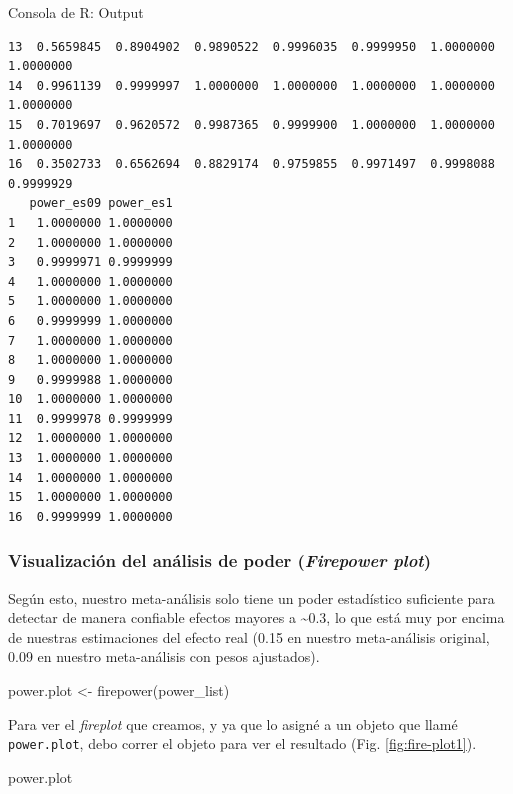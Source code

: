 \documentclass[
  bookmarksnumbered]{article}
\newenvironment{Shaded}{\begin{snugshade}}{\end{snugshade}}
\newcommand{\FunctionTok}[1]{\textcolor[rgb]{0.39,0.29,0.61}{#1}}
\newcommand{\NormalTok}[1]{\textcolor[rgb]{0.12,0.11,0.11}{#1}}
\newcommand{\OtherTok}[1]{\textcolor[rgb]{0.00,0.43,0.16}{#1}}
\begin{document}
\begin{ROut}{Consola de R: Output~\thetcbcounter}
\begin{footnotesize}
\begin{verbatim}
13  0.5659845  0.8904902  0.9890522  0.9996035  0.9999950  1.0000000  1.0000000
14  0.9961139  0.9999997  1.0000000  1.0000000  1.0000000  1.0000000  1.0000000
15  0.7019697  0.9620572  0.9987365  0.9999900  1.0000000  1.0000000  1.0000000
16  0.3502733  0.6562694  0.8829174  0.9759855  0.9971497  0.9998088  0.9999929
   power_es09 power_es1
1   1.0000000 1.0000000
2   1.0000000 1.0000000
3   0.9999971 0.9999999
4   1.0000000 1.0000000
5   1.0000000 1.0000000
6   0.9999999 1.0000000
7   1.0000000 1.0000000
8   1.0000000 1.0000000
9   0.9999988 1.0000000
10  1.0000000 1.0000000
11  0.9999978 0.9999999
12  1.0000000 1.0000000
13  1.0000000 1.0000000
14  1.0000000 1.0000000
15  1.0000000 1.0000000
16  0.9999999 1.0000000
 \end{verbatim}
                \end{footnotesize}
                \end{ROut}

\hypertarget{visualizaciuxf3n-del-anuxe1lisis-de-poder-firepower-plot}{%
\subsubsection{\texorpdfstring{Visualización del análisis de poder (\emph{Firepower plot})}{Visualización del análisis de poder (Firepower plot)}}\label{visualizaciuxf3n-del-anuxe1lisis-de-poder-firepower-plot}}

Según esto, nuestro meta-análisis solo tiene un poder estadístico suficiente para detectar de manera confiable efectos mayores a \textasciitilde0.3, lo que está muy por encima de nuestras estimaciones del efecto real (0.15 en nuestro meta-análisis original, 0.09 en nuestro meta-análisis con pesos ajustados).

\begin{Shaded}
\begin{Highlighting}[]
\NormalTok{power.plot }\OtherTok{\textless{}{-}} \FunctionTok{firepower}\NormalTok{(power\_list)}
\end{Highlighting}
\end{Shaded}

Para ver el \emph{fireplot} que creamos, y ya que lo asigné a un objeto que llamé \texttt{power.plot}, debo correr el objeto para ver el resultado (Fig. \ref{fig:fire-plot1}).

\begin{Shaded}
\begin{Highlighting}[]
\NormalTok{power.plot}
\end{Highlighting}
\end{Shaded}
\end{document}
